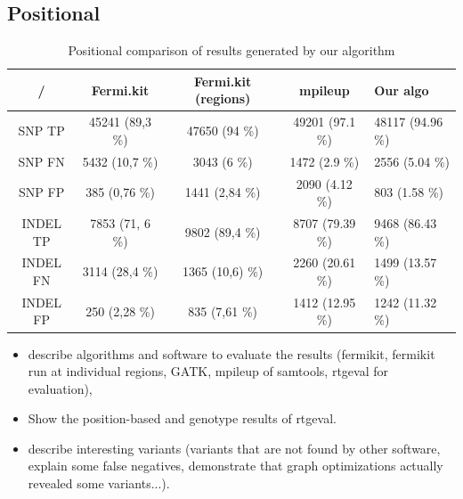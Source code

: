 \subsection{Positional}
\label{subsec:positional-results}

\begin{table}[h]
\begin{center}
\caption{Positional comparison of results generated by our algorithm}
\label{tab:positional-results}
\begin{tabular}{| c | c | c | c | p{3cm} |}
\hline
/ & Fermi.kit & Fermi.kit (regions) & mpileup & Our algo \\
\hline
SNP TP & 45241 (89,3 \%) & 47650 (94 \%) & 49201 (97.1 \%) & 48117 (94.96 \%) \\
\hline
SNP FN & 5432 (10,7 \%) & 3043 (6 \%) & 1472 (2.9 \%) & 2556 (5.04 \%) \\
\hline
SNP FP & 385 (0,76 \%) & 1441 (2,84 \%) & 2090 (4.12 \%) & 803 (1.58 \%) \\
\hline
INDEL TP & 7853 (71, 6 \%) & 9802 (89,4 \%) & 8707 (79.39 \%) & 9468 (86.43 \%) \\
\hline
INDEL FN & 3114 (28,4 \%) & 1365 (10,6) \%) & 2260 (20.61 \%) & 1499 (13.57 \%) \\
\hline
INDEL FP & 250 (2,28 \%) & 835 (7,61 \%) & 1412 (12.95 \%) & 1242 (11.32 \%) \\
\hline
\end{tabular}
\end{center}
\end{table}

\begin{itemize}
\item describe algorithms and software to evaluate the results (fermikit, fermikit run at individual regions, GATK, mpileup of samtools, rtgeval for evaluation),
\item Show the position-based and genotype results of rtgeval.
\item describe interesting variants (variants that are not found by other software, explain some false negatives, demonstrate that graph optimizations actually revealed some variants...).
\end{itemize}
